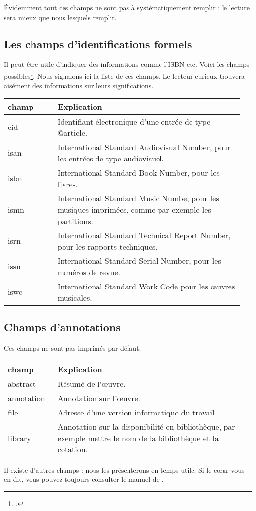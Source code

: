 Évidemment tout ces champs ne sont pas à systématiquement remplir : le lecture sera mieux que nous lesquels remplir.

\subsection{Les champs d'identifications formels}

Il peut être utile d'indiquer des informations comme l'ISBN etc. Voici les champs possibles\footcite[BibLaTeX imprimera ces champs par défaut, il est toutefois possible de ne pas les afficher en passant une option au chargement du package]{explicationisbn}. Nous signalons ici la liste de ces champs. Le lecteur curieux trouvera aisément des informations sur leurs significations.

\begin{longtable}{p{0.2\linewidth}p{0.75\linewidth}}
	champ 		& Explication \\
	\endhead
	eid			& Identifiant électronique d'une entrée de type @article. \\
	isan			& \textenglish{International Standard Audiovisual Number}, pour les entrées de type audiovisuel.\\
	isbn			& \textenglish{International Standard Book Number}, pour les livres. \\
	ismn			& \textenglish{International Standard Music Numbe}, pour les musiques imprimées, comme par exemple les partitions. \\
	isrn			& \textenglish{International Standard Technical Report Number}, pour les rapports techniques. \\
	issn			& \textenglish{International Standard Serial Number}, pour les numéros de revue. \\
	iswc			& \textenglish{International Standard Work Code} pour les œuvres musicales.
\end{longtable}

\subsection{Champs d'annotations}

Ces champs ne sont pas imprimés par défaut. 

\begin{longtable}{p{0.2\linewidth}p{0.75\linewidth}}
	champ 		& Explication \\
	\endhead
	abstract			& Résumé de l'œuvre. \\
	annotation			& Annotation sur l'œuvre.\\
	file			& Adresse d'une version informatique du travail. \\
	library			& Annotation sur la disponibilité en bibliothèque, par exemple mettre le nom de la bibliothèque et la cotation.
	
\end{longtable}

Il existe d'autres champs : nous les présenterons en temps utile. Si le cœur vous en dit, vous pouvez toujours consulter le manuel de .